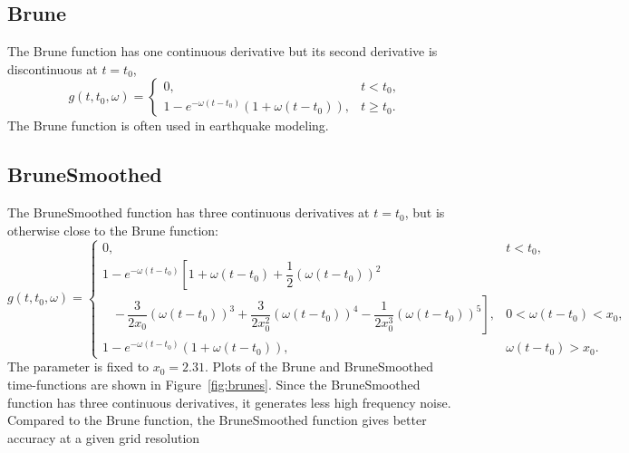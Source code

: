 \documentclass[11pt]{report}
\begin{document}
\subsection{Brune} 
 \label{brune}
The Brune function has one continuous derivative but its second derivative is discontinuous at
$t=t_0$,
\[
 g(t,t_0,\omega) = \left\{
\begin{array}{ll} 
0, & t < t_0, \\ 
1 - e^{-\omega(t-t_0)}( 1+\omega(t-t_0) ), & t \geq t_0.
\end{array}
\right.
\]
The Brune function is often used in earthquake modeling.
\subsection{BruneSmoothed}
The BruneSmoothed function has three continuous derivatives at
$t=t_0$, but is otherwise close to the Brune function:
\[
 g(t,t_0,\omega) = \left\{
\begin{array}{ll} 
0, & t < t_0, \\ 
1 - e^{-\omega(t-t_0)}\left[ 1+\omega(t-t_0) + \dfrac{1}{2}(\omega(t-t_0))^2\right. & \\
\quad \left.-\,\dfrac{3}{2x_0}( \omega(t-t_0))^3  + \dfrac{3}{2x_0^2}( \omega(t-t_0))^4 -
 \dfrac{1}{2x_0^3}( \omega(t-t_0))^5 \right], & 0< \omega (t-t_0) < x_0,\\
1 - e^{-\omega(t-t_0)}( 1+\omega(t-t_0) ), & \omega (t-t_0) > x_0.
\end{array}
\right.
\]
The parameter is fixed to $x_0 = 2.31$. Plots of the Brune and BruneSmoothed time-functions are
shown in Figure~\ref{fig:brunes}. Since the BruneSmoothed function has three continuous derivatives,
it generates less high frequency noise. Compared to the Brune function, the BruneSmoothed function
gives better accuracy at a given grid resolution
\end{document}
